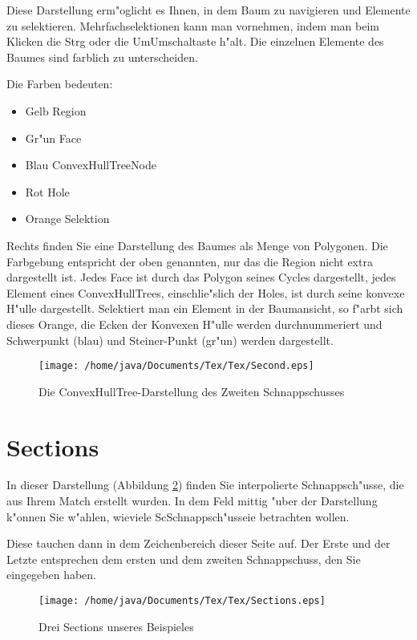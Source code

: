 \documentclass[a4paper,10pt,twoside]{scrreprt}
\begin{document}
Diese Darstellung erm"oglicht es Ihnen, in dem Baum zu navigieren und Elemente zu selektieren. Mehrfachselektionen kann man vornehmen, indem man beim Klicken die Strg oder die UmUmschaltaste h"alt. Die einzelnen Elemente des Baumes sind farblich zu unterscheiden.

Die Farben bedeuten:
\begin{itemize}
\item Gelb Region
\item Gr"un Face
\item Blau ConvexHullTreeNode
\item Rot Hole
\item Orange Selektion
\end{itemize} 

Rechts finden Sie eine Darstellung des Baumes als Menge von Polygonen. Die Farbgebung entspricht der oben genannten, nur das die Region nicht extra dargestellt ist. Jedes Face ist durch das Polygon seines Cycles dargestellt, jedes Element eines ConvexHullTrees, einschlie"slich der Holes, ist durch seine konvexe H"ulle dargestellt. Selektiert man ein Element in der Baumansicht, so f"arbt sich dieses Orange, die Ecken der Konvexen H"ulle werden durchnummeriert und Schwerpunkt (blau) und Steiner-Punkt (gr"un) werden dargestellt.

\begin{figure}
   \centering
   \texttt{[image: /home/java/Documents/Tex/Tex/Second.eps]}
   \caption{Die ConvexHullTree-Darstellung des Zweiten Schnappschusses}
   \label{fig:Second}
\end{figure}
\section{Sections}
In dieser Darstellung (Abbildung \ref{fig:Sections}) finden Sie interpolierte Schnappsch"usse, die aus Ihrem Match erstellt wurden. In dem Feld mittig "uber der Darstellung k"onnen Sie w"ahlen, wieviele ScSchnappsch"usseie betrachten wollen. 

Diese tauchen dann in dem Zeichenbereich dieser Seite auf. Der Erste und der Letzte entsprechen dem ersten und dem zweiten Schnappschuss, den Sie eingegeben haben.
\begin{figure}
   \centering
   \texttt{[image: /home/java/Documents/Tex/Tex/Sections.eps]}
   \caption{Drei Sections unseres Beispieles}
   \label{fig:Sections}
\end{figure}
\end{document}
